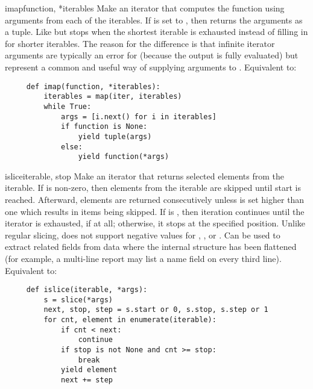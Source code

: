 \begin{funcdesc}{imap}{function, *iterables}
  Make an iterator that computes the function using arguments from
  each of the iterables.  If  is set to , then
   returns the arguments as a tuple.  Like
   but stops when the shortest iterable is exhausted
  instead of filling in  for shorter iterables.  The reason
  for the difference is that infinite iterator arguments are typically
  an error for  (because the output is fully evaluated)
  but represent a common and useful way of supplying arguments to
  .
  Equivalent to:

  \begin{verbatim}
     def imap(function, *iterables):
         iterables = map(iter, iterables)
         while True:
             args = [i.next() for i in iterables]
             if function is None:
                 yield tuple(args)
             else:
                 yield function(*args)
  \end{verbatim}
\end{funcdesc}

\begin{funcdesc}{islice}{iterable,  stop }
  Make an iterator that returns selected elements from the iterable.
  If  is non-zero, then elements from the iterable are skipped
  until start is reached.  Afterward, elements are returned consecutively
  unless  is set higher than one which results in items being
  skipped.  If  is , then iteration continues until
  the iterator is exhausted, if at all; otherwise, it stops at the specified
  position.  Unlike regular slicing,
   does not support negative values for ,
  , or .  Can be used to extract related fields
  from data where the internal structure has been flattened (for
  example, a multi-line report may list a name field on every
  third line).  Equivalent to:

  \begin{verbatim}
     def islice(iterable, *args):
         s = slice(*args)
         next, stop, step = s.start or 0, s.stop, s.step or 1
         for cnt, element in enumerate(iterable):
             if cnt < next:
                 continue
             if stop is not None and cnt >= stop:
                 break
             yield element
             next += step             
  \end{verbatim}
\end{funcdesc}


